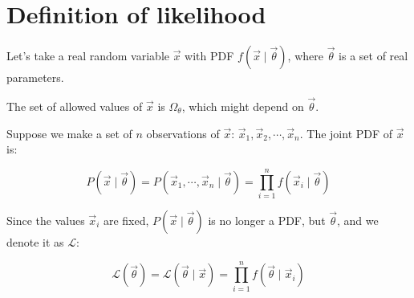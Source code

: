 

\section{Definition of likelihood}
\label{sec:def_of_likelihood}

Let's take a real random variable $\vec{x}$ with PDF $f\left( \vec{x} \mid \vec{\theta} \right) $, where $\vec{\theta}$ is a set of real parameters.

The set of allowed values of $\vec{x}$ is $\Omega_{\theta}$, which might depend on $\vec{\theta}$.

Suppose we make a set of $n$ observations of $\vec{x}$: $\vec{x}_{1}, \vec{x}_{2}, \cdots, \vec{x}_{n}$. The joint PDF of $\vec{x}$ is:

\begin{equation}
	P\left( \vec{x} \mid \vec{\theta} \right) 
	= P\left( \vec{x}_{1}, \cdots, \vec{x}_{n} \mid \vec{\theta} \right) 
	= \prod_{i = 1}^{n} {f\left( \vec{x}_{i} \mid \vec{\theta} \right)}
\end{equation}

Since the values $\vec{x}_{i}$ are fixed, $P\left( \vec{x} \mid \vec{\theta} \right)$ is no longer a PDF, but  $\vec{\theta}$, and we denote it as $\mathcal{L}$:

\begin{equation}\label{eq:def_of_likelihood}
	\mathcal{L}\left( \vec{\theta} \right) 
	= \mathcal{L}\left( \vec{\theta} \mid \vec{x} \right) 
	= \prod_{i = 1}^{n} {f\left( \vec{\theta} \mid \vec{x}_{i} \right)}
\end{equation}
